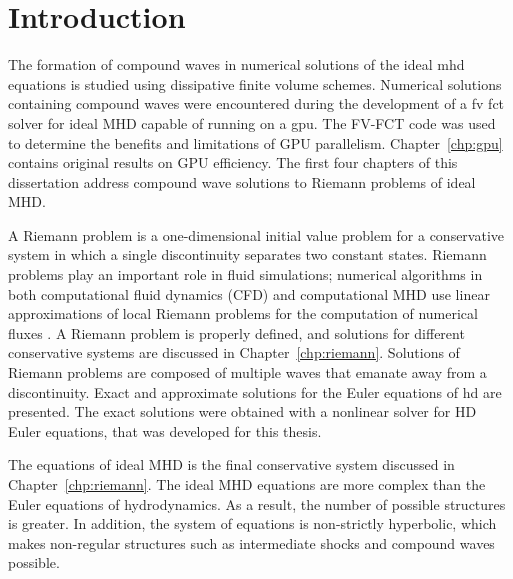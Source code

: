 %
%


\chapter[Introduction]{Introduction}
\label{chp:intro}

The formation of compound waves in numerical solutions of the ideal \gls{mhd} equations is studied using dissipative finite volume schemes.  Numerical solutions containing compound waves were encountered during the development of a \gls{fv} \gls{fct} solver for ideal MHD capable of running on a \gls{gpu}.  The FV-FCT code was used to determine the benefits and limitations of GPU parallelism.  Chapter~\ref{chp:gpu} contains original results on GPU efficiency.  The first four chapters of this dissertation address compound wave solutions to Riemann problems of ideal MHD. 

A Riemann problem is a one-dimensional initial value problem for a conservative system in which a single discontinuity separates two constant states.  Riemann problems play an important role in fluid simulations; numerical algorithms in both computational fluid dynamics (CFD) and computational MHD use linear approximations of local Riemann problems for the computation of numerical fluxes \citep{Brio:1988,Ryu:1995a}.  A Riemann problem is properly defined, and solutions for different conservative systems are discussed in Chapter~\ref{chp:riemann}.  Solutions of Riemann problems are composed of multiple waves that emanate away from a discontinuity.  Exact and approximate solutions for the Euler equations of \gls{hd} are presented.   The exact solutions were obtained with a nonlinear solver for HD Euler equations, that was developed for this thesis.

The equations of ideal MHD is the final conservative system discussed in Chapter~\ref{chp:riemann}.  The ideal MHD equations are more complex than the Euler equations of hydrodynamics. As a result, the number of possible structures is greater.  In addition, the system of equations is non-strictly hyperbolic, which makes non-regular structures such as intermediate shocks and compound waves possible.  

